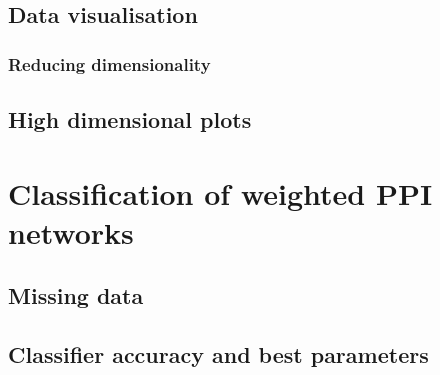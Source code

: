 

\subsection{Data visualisation}


\subsubsection{Reducing dimensionality}



\subsection{High dimensional plots}






\section{Classification of weighted PPI networks}

\subsection{Missing data}


\subsection{Classifier accuracy and best parameters}


